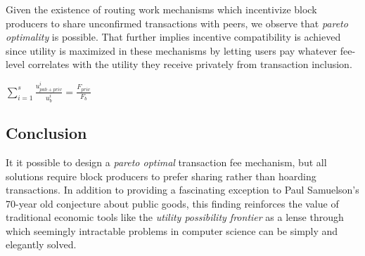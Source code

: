 \documentclass[oneside]{article}   	%
\begin{document}
Given the existence of routing work mechanisms which incentivize block producers to share unconfirmed transactions with peers, we observe that \textit{pareto optimality} is possible. That further implies incentive compatibility is achieved since utility is maximized in these mechanisms by letting users pay whatever fee-level correlates with the utility they receive privately from transaction inclusion.

\LARGE
\begin{adjustwidth}{1.5em}{1.5em} 
\begin{math}
\sum_{i=1}^{s} \frac{u_{{pub}+{priv}}^i}{u_b^i} = \frac{F_{{priv}}}{F_b}
\end{math}
\end{adjustwidth}
\normalsize


\subsection*{Conclusion}

It it possible to design a \textit{pareto optimal} transaction fee mechanism, but all solutions require block producers to prefer sharing rather than hoarding transactions. In addition to providing a fascinating exception to Paul Samuelson's 70-year old conjecture about public goods, this finding reinforces the value of traditional economic tools like the \textit{utility possibility frontier} as a lense through which seemingly intractable problems in computer science can be simply and elegantly solved.

\pagebreak

\nocite{*}
\end{document}
